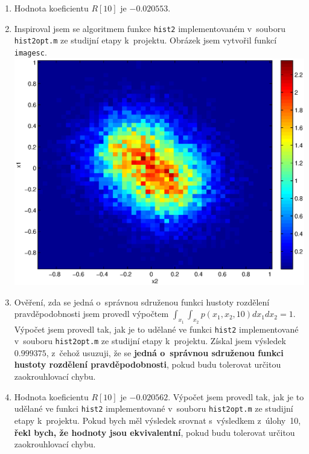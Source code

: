 \documentclass[a4paper, 11pt, twocolumn]{article}
\begin{document}
\begin{enumerate}
		\item
			Hodnota koeficientu $ R[10] $ je $ \mathbf{-0.020553} $.

		\item
			Inspiroval jsem se algoritmem funkce \texttt{hist2} implementovaném v~souboru
			\texttt{hist2opt.m} ze studijní etapy k~projektu. Obrázek jsem vytvořil funkcí \texttt{imagesc}.
			\\ \includegraphics[width=\linewidth]{inc/11.eps}

		\item
			Ověření, zda se jedná o~správnou sdruženou funkci hustoty rozdělení pravděpodobnosti
			jsem provedl výpočtem $ \int_{x_1} \int_{x_2} p(x_1, x_2, 10) dx_1 dx_2 = 1 $.
			Výpočet jsem provedl tak, jak je to udělané ve funkci \texttt{hist2} implementované
			v~souboru \texttt{hist2opt.m} ze studijní etapy k~projektu. Získal jsem výsledek
			$ \mathbf{0.999375} $, z~čehož usuzuji, že se \textbf{jedná o~správnou sdruženou
			funkci hustoty rozdělení pravděpodobnosti}, pokud budu tolerovat určitou zaokrouhlovací chybu.

		\item
			Hodnota koeficientu $ R[10] $ je $ \mathbf{-0.020562} $. Výpočet jsem provedl tak,
			jak je to udělané ve funkci \texttt{hist2} implementované v~souboru \texttt{hist2opt.m}
			ze studijní etapy k~projektu. Pokud bych měl výsledek srovnat s~výsledkem z~úlohy~10,
			\textbf{řekl bych, že hodnoty jsou ekvivalentní}, pokud budu tolerovat určitou zaokrouhlovací
			chybu.
	\end{enumerate}
\end{document}
